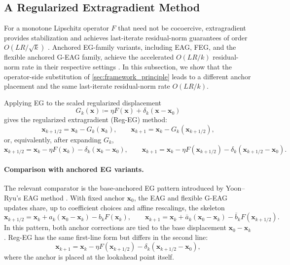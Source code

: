 \documentclass[letterpaper,11pt]{article}
\newcommand{\vect}[1]{\mathbf{#1}}
\begin{document}

\subsection{A Regularized Extragradient Method}
\label{subsec:reg-eg}

For a monotone Lipschitz operator \(F\) that need not be cocoercive,
extragradient provides stabilization and achieves last-iterate residual-norm
guarantees of order \(O(LR/\sqrt{k})\)
\cite{gorbunov2022extragradient}. Anchored EG-family variants, including EAG,
FEG, and the flexible anchored G-EAG family, achieve the accelerated
\(O(LR/k)\) residual-norm rate in their respective settings
\cite{yoon2021accelerated,lee2021fast,boct2024extra}. In this subsection,
we show that the operator-side substitution of \cref{sec:framework_principle}
leads to a different anchor placement and the same last-iterate
residual-norm rate \(O(LR/k)\).

Applying EG to the scaled regularized displacement
\[
    G_k(\vect{x}) \coloneqq \eta F(\vect{x}) + \delta_k(\vect{x} - \vect{x}_0)
\]
gives the regularized extragradient (Reg-EG) method:
\begin{equation} \label{eq:reg_eg}
    \vect{x}_{k+1/2} = \vect{x}_k - G_k(\vect{x}_k),
    \qquad
    \vect{x}_{k+1}   = \vect{x}_k - G_k(\vect{x}_{k+1/2}),
\end{equation}
or, equivalently, after expanding \(G_k\),
\[
    \vect{x}_{k+1/2}
    = \vect{x}_k-\eta F(\vect{x}_k)-\delta_k(\vect{x}_k-\vect{x}_0),
    \qquad
    \vect{x}_{k+1}
    = \vect{x}_k-\eta F(\vect{x}_{k+1/2})
      -\delta_k(\vect{x}_{k+1/2}-\vect{x}_0).
\]

\paragraph{Comparison with anchored EG variants.}
The relevant comparator is the base-anchored EG pattern introduced by
Yoon--Ryu's EAG method \cite{yoon2021accelerated}. With fixed anchor
\(\vect{x}_0\), the EAG and flexible G-EAG updates share, up to coefficient
choices and affine rescalings, the skeleton \cite{boct2024extra}
\[
    \vect{x}_{k+1/2}
    =
    \vect{x}_k+a_k(\vect{x}_0-\vect{x}_k)-b_kF(\vect{x}_k),
    \qquad
    \vect{x}_{k+1}
    =
    \vect{x}_k+\bar a_k(\vect{x}_0-\vect{x}_k)-\bar b_kF(\vect{x}_{k+1/2}).
\]
In this pattern, both anchor
corrections are tied to the base displacement \(\vect{x}_0-\vect{x}_k\).
Reg-EG has the same first-line form but differs in the second line:
\[
    \vect{x}_{k+1}
    =
    \vect{x}_k-\eta F(\vect{x}_{k+1/2})
    -\delta_k(\vect{x}_{k+1/2}-\vect{x}_0),
\]
where the anchor is placed at the lookahead point itself.
\end{document}
